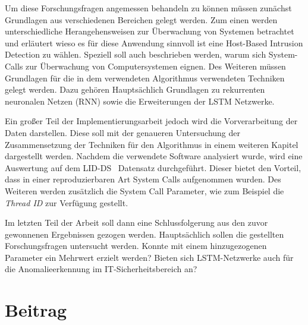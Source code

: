 Um diese Forschungsfragen angemessen behandeln zu können müssen zunächst Grundlagen aus verschiedenen Bereichen gelegt werden.
Zum einen werden unterschiedliche Herangehensweisen zur Überwachung von Systemen betrachtet und erläutert wieso es für diese Anwendung sinnvoll ist eine Host-Based Intrusion Detection zu wählen.
Speziell soll auch beschrieben werden, warum sich System-Calls zur Überwachung von Computersystemen eignen.
Des Weiteren müssen Grundlagen für die in dem verwendeten Algorithmus verwendeten Techniken gelegt werden.
Dazu gehören Hauptsächlich Grundlagen zu rekurrenten neuronalen Netzen (RNN) sowie die Erweiterungen der LSTM Netzwerke.

Ein großer Teil der Implementierungsarbeit jedoch wird die Vorverarbeitung der Daten darstellen.
Diese soll mit der genaueren Untersuchung der Zusammensetzung der Techniken für den Algorithmus in einem weiteren Kapitel dargestellt werden.
Nachdem die verwendete Software analysiert wurde, wird eine Auswertung auf dem LID-DS~\cite{LID-DS} Datensatz durchgeführt.
Dieser bietet den Vorteil, dass in einer reproduzierbaren Art System Calls aufgenommen wurden.
Des Weiteren werden zusätzlich die System Call Parameter, wie zum Beispiel die \textit{Thread ID} zur Verfügung gestellt.

Im letzten Teil der Arbeit soll dann eine Schlussfolgerung aus den zuvor gewonnenen Ergebnissen gezogen werden. 
Hauptsächlich sollen die gestellten Forschungsfragen untersucht werden.
Konnte mit einem hinzugezogenen Parameter ein Mehrwert erzielt werden?
Bieten sich LSTM-Netzwerke auch für die Anomalieerkennung im IT-Sicherheitsbereich an?

\section{Beitrag}
